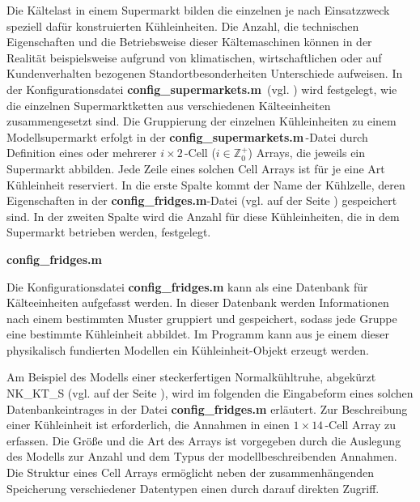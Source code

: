 Die Kältelast in einem Supermarkt bilden die einzelnen je nach Einsatzzweck
speziell dafür konstruierten Kühleinheiten. Die Anzahl, die technischen
Eigenschaften und die Betriebsweise dieser Kältemaschinen können in der Realität
beispielsweise aufgrund von klimatischen, wirtschaftlichen oder auf
Kundenverhalten bezogenen Standortbesonderheiten Unterschiede aufweisen. In der
Konfigurationsdatei \textbf{config\_supermarkets.m$\,$} (vgl. )
wird festgelegt, wie die einzelnen Supermarktketten aus verschiedenen
Kälteeinheiten zusammengesetzt sind. Die Gruppierung der einzelnen Kühleinheiten
zu einem Modellsupermarkt erfolgt in der
\textbf{config\_supermarkets.m$\,$}-Datei durch Definition eines oder mehrerer
$i\times2\,$-Cell ($i\in \mathbb{Z}^+_0$) Arrays, die jeweils ein Supermarkt
abbilden. Jede Zeile eines solchen Cell Arrays ist für je eine Art Kühleinheit
reserviert. In die erste Spalte kommt der Name der K\"uhlzelle, deren
Eigenschaften in der \textbf{config\_fridges.m}-Datei (vgl.  auf
der Seite \pageref{fridge}) gespeichert sind. In der zweiten Spalte wird die
Anzahl f\"ur diese K\"uhleinheiten, die in dem Supermarkt betrieben werden,
festgelegt.

\vspace{3mm}%
\noindent\textbf{config\_fridges.m}
\vspace{3mm}

Die Konfigurationsdatei \textbf{config\_fridges.m} kann als eine Datenbank für
Kälteeinheiten aufgefasst werden. In dieser Datenbank werden Informationen nach
einem bestimmten Muster gruppiert und gespeichert, sodass jede Gruppe eine
bestimmte Kühleinheit abbildet. Im Programm kann aus je einem dieser
physikalisch fundierten Modellen ein Kühleinheit-Objekt erzeugt werden.

Am Beispiel des Modells einer steckerfertigen Normalkühltruhe, abgekürzt
NK\_KT\_S (vgl.  auf der Seite \pageref{fridge}), wird im
folgenden die Eingabeform eines solchen Datenbankeintrages in der Datei
\textbf{config\_fridges.m} erläutert.  Zur Beschreibung einer Kühleinheit ist
erforderlich, die Annahmen in einen $1\times14\,$-Cell Array zu erfassen. Die Größe
und die Art des Arrays ist vorgegeben durch die Auslegung des Modells zur Anzahl
und dem Typus der modellbeschreibenden Annahmen. Die Struktur eines Cell Arrays
ermöglicht neben der zusammenhängenden Speicherung verschiedener
Datentypen einen durch \matlab darauf direkten Zugriff.

